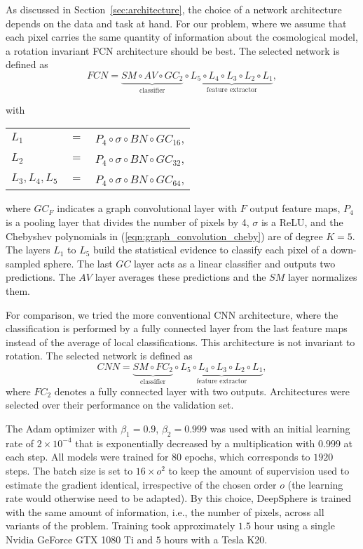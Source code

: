 \documentclass[final,twocolumn,3p,times,sort&compress]{elsarticle}
\newcommand{\secref}[1]{Section~\ref{sec:#1}}
\newcommand{\eqnref}[1]{(\ref{eqn:#1})}
\newcommand{\1}{\b{1}}              %
\newcommand{\0}{\b{0}}              %
\begin{document}
As discussed in \secref{architecture}, the choice of a network architecture depends on the data and task at hand.
For our problem, where we assume that each pixel carries the same quantity of information about the cosmological model, a rotation invariant FCN architecture should be best.
The selected network is defined as
\begin{equation*}
	FCN = \underbrace{SM \circ AV \circ GC_2}_{\text{classifier}} \circ \underbrace{L_5 \circ L_4 \circ L_3 \circ L_2 \circ L_1}_{\text{feature extractor}},
\end{equation*}
\begin{center}
with \hspace{0.5cm} \begin{tabular}{lll}
   $L_1$ &  $=$ &$ P_4 \circ \sigma \circ BN \circ GC_{16}$, \\
   $L_2$ &  $=$ &$ P_4 \circ \sigma \circ BN \circ GC_{32}$, \\
   $L_3,L_4,L_5$ & $=$ &$ P_4 \circ \sigma \circ BN \circ GC_{64}$, \\
\end{tabular}
\end{center}
where $GC_F$ indicates a graph convolutional layer with $F$ output feature maps, $P_4$ is a pooling layer that divides the number of pixels by 4, $\sigma$ is a ReLU, and the Chebyshev polynomials in \eqnref{graph_convolution_cheby} are of degree $K=5$.
The layers $L_1$ to $L_5$ build the statistical evidence to classify each pixel of a down-sampled sphere.
The last $GC$ layer acts as a linear classifier and outputs two predictions.
The $AV$ layer averages these predictions and the $SM$ layer normalizes them.

For comparison, we tried the more conventional CNN architecture, where the classification is performed by a fully connected layer from the last feature maps instead of the average of local classifications. This architecture is not invariant to rotation. The selected network is defined as
\begin{equation*}
	CNN = \underbrace{SM \circ FC_2}_{\text{classifier}} \circ \underbrace{L_5 \circ L_4 \circ L_3 \circ L_2 \circ L_1}_{\text{feature extractor}},
\end{equation*}
where $FC_2$ denotes a fully connected layer with two outputs.
Architectures were selected over their performance on the validation set.

The Adam optimizer \citep{kingma2014adam} with $\beta_1=0.9$, $\beta_2=0.999$ was used with an initial learning rate of $2 \times 10^{-4}$ that is exponentially decreased by a multiplication with $0.999$ at each step.
All models were trained for $80$ epochs, which corresponds to $1920$ steps. The batch size is set to $16 \times  o^2$ to keep the amount of supervision used to estimate the gradient identical, irrespective of the chosen order $o$ (the learning rate would otherwise need to be adapted). By this choice, DeepSphere is trained with the same amount of information, i.e., the number of pixels, across all variants of the problem.
Training took approximately $1.5$ hour using a single Nvidia GeForce GTX 1080 Ti and $5$ hours with a Tesla K20.
\end{document}
